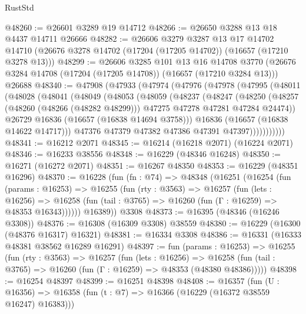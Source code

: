 \begin{lexlean}{RustStd}
\begin{coremodule}
@48260 := @26601 @3289 @19 @14712
@48266 := @26650 @3288 @13 @18 @4437 @14711 @26666
@48282 := @26606
    @3279
    @3287
    @13
    @17
    @14702
    @14710
    (@26676 @3278 @14702 (@17204 (@17205 @14702)) (@16657 (@17210 @3278 @13)))
@48299 := @26606
    @3285
    @101
    @13
    @16
    @14708
    @3770
    (@26676 @3284 @14708 (@17204 (@17205 @14708)) (@16657 (@17210 @3284 @13)))
    @26688
@48340 := @47908
    (@47933
      (@47974
        (@47976
          (@47978
            (@47995
              (@48011
                (@48028
                  (@48041
                    (@48049
                      (@48053
                        (@48059
                          (@48237
                            (@48247
                              (@48250
                                (@48257
                                  (@48260 (@48266 (@48282 @48299)))
                                  @47275
                                  @47278
                                  @47281
                                  @47284
                                  @24474))
                              @26729
                              @16836
                              (@16657 (@16838 @14694 @3758)))
                            @16836
                            (@16657 (@16838 @14622 @14717)))
                          @47376
                          @47379
                          @47382
                          @47386
                          @47391
                          @47397)))))))))))
@48341 := @16212 @2071
@48345 := @16214 (@16218 @2071) (@16224 @2071)
@48346 := @16233 @38556
@48348 := @16229 (@48346 @16248)
@48350 := @16271 (@16272 @2071)
@48351 := @16267 @48350
@48353 := @16229 (@48351 @16296)
@48370 := @16228
    (fun (fn : @74) =>
    @48348
      (@16251
        (@16254
          (fun (params : @16253) =>
          @16255
            (fun (rty : @3563) =>
            @16257
              (fun (lets : @16256) =>
              @16258 (fun (tail : @3765) => @16260 (fun (Γ : @16259) => @48353 @16343))))))
        @16389))
    @3308
@48373 := @16395 (@48346 (@16246 @3308))
@48376 := @16308 (@16309 @3308) @38559
@48380 := @16229 (@16300 (@48376 @16317) @16321)
@48381 := @16334 @3308
@48386 := @16331 (@16333 @48381 @38562 @16289 @16291)
@48397 := fun (params : @16253) =>
  @16255
    (fun (rty : @3563) =>
    @16257
      (fun (lets : @16256) =>
      @16258 (fun (tail : @3765) => @16260 (fun (Γ : @16259) => @48353 (@48380 @48386)))))
@48398 := @16254 @48397
@48399 := @16251 @48398
@48408 := @16357
    (fun (U : @16356) => @16358 (fun (t : @7) => @16366 (@16229 (@16372 @38559 @16247) @16383)))

\end{coremodule}
\end{lexlean}
